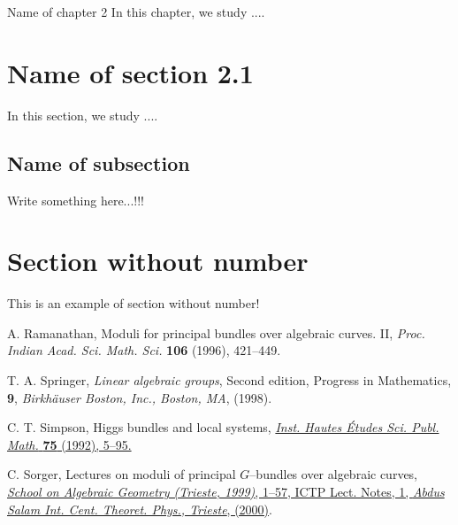 \documentclass[11pt,english,
onehalfspacing,
headsepline]{thesis}
\numberwithin{equation}{subsection}
\theoremstyle{definition}
\begin{document}
\begin{chapter}{Name of chapter 2}\label{ch-2}
In this chapter, we study .... 
\section{Name of section 2.1}\label{sec-2.1}
In this section, we study .... 

\subsection{Name of subsection}\label{sec-2.1.1}
Write something here...!!! 

\section*{Section without number}\label{sec-2.2-nonum}
This is an example of section without number! 

\end{chapter}

\cleardoublepage{}
\begin{thebibliography}{AAAA}

 A. Ramanathan, Moduli for principal bundles over algebraic curves. II, 
\textit{Proc. Indian Acad. Sci. Math. Sci.} {\bf 106} (1996), 421--449. 

 T. A. Springer, \textit{Linear algebraic groups}, Second edition, 
Progress in Mathematics, \textbf{9}, \textit{Birkhäuser Boston, Inc., Boston, MA}, (1998). 

 C. T. Simpson, Higgs bundles and local systems, 
\href{http://www.numdam.org/item?id=PMIHES_1992__75__5_0}{\textit{Inst. Hautes \'{E}tudes 
Sci. Publ. Math.} \textbf{75} (1992), 5--95.} 

 C. Sorger, Lectures on moduli of principal $G$--bundles over algebraic curves, 
\href{http://users.ictp.it/\~pub_off/lectures/lns001/Sorger/Sorger.pdf}{\textit{School on Algebraic 
Geometry (Trieste, 1999)}, 1--57, ICTP Lect. Notes, 1, \textit{Abdus Salam Int. Cent. Theoret. Phys., 
Trieste}, (2000)}. 

\end{thebibliography}
\end{document}
